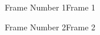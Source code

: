 \documentclass{beamer}
\begin{document}
\begin{frame}{Frame Number 1}{Frame 1}
\blindtext[2]
\end{frame}
\begin{frame}{Frame Number 2}{Frame 2}
\smaller
\blindtext[2]
\end{frame}
\end{document}
